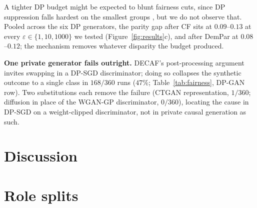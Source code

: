 \documentclass{article}
\begin{document}
A tighter DP budget might be expected to blunt fairness cuts, since DP
suppression falls hardest on the smallest groups
\citep{bagdasaryan2019disparate}, but we do not observe that. Pooled across
the six DP generators, the parity gap after CF sits at $0.09$--$0.13$ at
every $\varepsilon \in \{1, 10, 1000\}$ we tested
(Figure~\ref{fig:results}c), and after DemPar at $0.08$--$0.12$; the
mechanism removes whatever disparity the budget produced.

\textbf{One private generator fails outright.} DECAF's post-processing
argument invites swapping in a DP-SGD \citep{abadi2016dpsgd} discriminator;
doing so collapses the synthetic outcome to a single class in $168/360$ runs
($47\%$; Table~\ref{tab:fairness}, DP-GAN row). Two substitutions each remove
the failure (CTGAN representation, $1/360$; diffusion in place of the
WGAN-GP discriminator, $0/360$), locating the cause in DP-SGD on a
weight-clipped discriminator, not in private causal generation as such.

\section{Discussion}
\label{sec:discussion}
\wkDiscussion




\appendix

\section{Role splits}
\label{app:roles}
\end{document}
